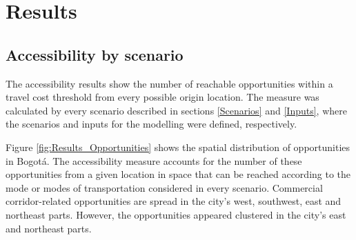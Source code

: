 \documentclass[12pt, a4paper]{report}
\begin{document}
\chapter{Results} \label{Chap5}

\section{Accessibility by scenario}

The accessibility results show the number of reachable opportunities within a travel cost threshold from every possible origin location. The measure was calculated by every scenario described in sections \ref{Scenarios} and \ref{Inputs}, where the scenarios and inputs for the modelling were defined, respectively.



Figure \ref{fig:Results_Opportunities} shows the spatial distribution of opportunities in Bogotá. The accessibility measure accounts for the number of these opportunities from a given location in space that can be reached according to the mode or modes of transportation considered in every scenario. Commercial corridor-related opportunities are spread in the city's west, southwest, east and northeast parts. However, the opportunities appeared clustered in the city's east and northeast parts.
\end{document}
